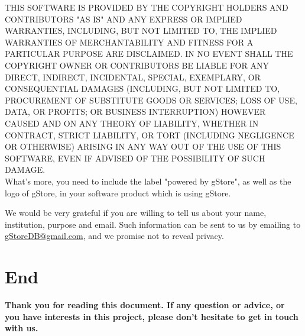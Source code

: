 \documentclass[titlepage, a4paper, 12pt]{article}
\begin{document}
THIS SOFTWARE IS PROVIDED BY THE COPYRIGHT HOLDERS AND CONTRIBUTORS "AS IS" AND ANY EXPRESS OR IMPLIED WARRANTIES, INCLUDING, BUT NOT LIMITED TO, THE IMPLIED WARRANTIES OF MERCHANTABILITY AND FITNESS FOR A PARTICULAR PURPOSE ARE DISCLAIMED. IN NO EVENT SHALL THE COPYRIGHT OWNER OR CONTRIBUTORS BE LIABLE FOR ANY DIRECT, INDIRECT, INCIDENTAL, SPECIAL, EXEMPLARY, OR CONSEQUENTIAL DAMAGES (INCLUDING, BUT NOT LIMITED TO, PROCUREMENT OF SUBSTITUTE GOODS OR SERVICES; LOSS OF USE, DATA, OR PROFITS; OR BUSINESS INTERRUPTION) HOWEVER CAUSED AND ON ANY THEORY OF LIABILITY, WHETHER IN CONTRACT, STRICT LIABILITY, OR TORT (INCLUDING NEGLIGENCE OR OTHERWISE) ARISING IN ANY WAY OUT OF THE USE OF THIS SOFTWARE, EVEN IF ADVISED OF THE POSSIBILITY OF SUCH DAMAGE. \\

What's more, you need to include the label "powered by gStore", as well as the logo of gStore, in your software product which is using gStore.

We would be very grateful if you are willing to tell us about your name, institution, purpose and email.  Such information can be sent to us by emailing to \href{mailto:gStoreDB@gmail.com}{gStoreDB@gmail.com}, and we promise not to reveal privacy.

\clearpage

\section{End}
\textbf{Thank you for reading this document. If any question or advice, or you have interests in this project, please don't hesitate to get in touch with us.}

\clearpage
\end{document}
